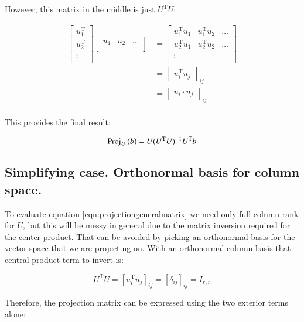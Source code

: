 \documentclass{article}      %
\newcommand{\T}[0]{\text{T}}
\begin{document}
However, this matrix in the middle is just $U^\T U$:

\begin{align*}
\begin{bmatrix}
u_1^\T \\
u_2^\T \\
\vdots \\
\end{bmatrix}
\begin{bmatrix}
{u_1} & {u_2} & \hdots \\
\end{bmatrix}
&=
\begin{bmatrix}
u_1^\T {u_1} & u_1^\T {u_2} & \hdots \\
u_2^\T {u_1} & u_2^\T {u_2} & \hdots \\
\vdots & & \\
\end{bmatrix} \\
&=
{
\begin{bmatrix}
u_i^\T {u_j}
\end{bmatrix}
}_{ij} \\
&=
{
\begin{bmatrix}
{u_i} \cdot {u_j}
\end{bmatrix}
}_{ij} \\
\end{align*}

This provides the final result:

\begin{equation}\label{eqn:projectiongeneralmatrix}
\Proj_{U}\left(b\right) = U (U^\T U)^{-1} U^\T b
\end{equation}

\subsection{ Simplifying case.  Orthonormal basis for column space. }

To evaluate equation \ref{eqn:projectiongeneralmatrix} we need only full column rank for $U$, but this will be messy in general due to the matrix inversion required for the center product.  That can be avoided by picking an orthonormal basis for the vector space that we are projecting on.  With an orthonormal column basis that 
central product term to invert is:

\[
U^\T U = [ u_i^\T u_j ]_{ij} = [ \delta_{ij} ]_{ij} = I_{r,r}
\]

Therefore, the projection matrix can be expressed using the two exterior terms alone:
\end{document}
